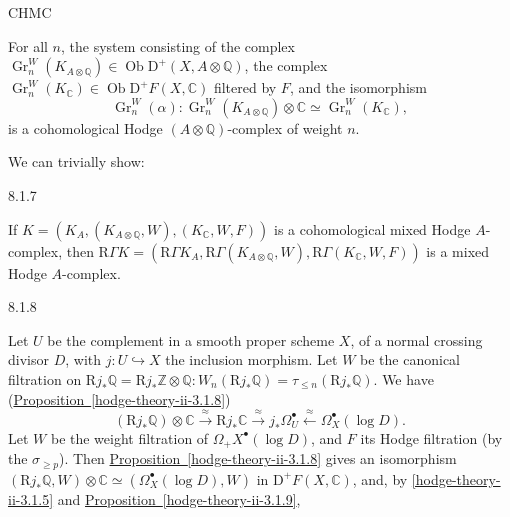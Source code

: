     \begin{axiom}{CHMC}\label{hodge-theory-iii-8.1.6-chmc}\skipsinglepar\par{}For all \(n\), the system consisting of the complex \(\operatorname {Gr}_n^W(K_{A\otimes \mathbb {Q}})\in \operatorname {Ob}\mathrm {D}^+(X,A\otimes \mathbb {Q})\), the complex \(\operatorname {Gr}_n^W(K_\mathbb {C})\in \operatorname {Ob}\mathrm {D}^+F(X,\mathbb {C})\) filtered by \(F\), and the isomorphism
        \[           \operatorname {Gr}_n^W(\alpha )\colon            \operatorname {Gr}_n^W(K_{A\otimes \mathbb {Q}})\otimes \mathbb {C}           \simeq  \operatorname {Gr}_n^W(K_\mathbb {C}),         \]
        is a cohomological Hodge \((A\otimes \mathbb {Q})\)-complex of weight \(n\).\end{axiom}\par{}We can trivially show:\begin{proposition}{8.1.7}\label{hodge-theory-iii-8.1.7}\skipsinglepar\par{}If \(K=(K_A,(K_{A\otimes \mathbb {Q}},W),(K_\mathbb {C},W,F))\) is a cohomological mixed Hodge \(A\)-complex, then \(\mathrm {R}\Gamma  K=(\mathrm {R}\Gamma  K_A,\mathrm {R}\Gamma (K_{A\otimes \mathbb {Q}},W),\mathrm {R}\Gamma (K_\mathbb {C},W,F))\) is a mixed Hodge \(A\)-complex.\end{proposition}\begin{scholium}{8.1.8}\label{hodge-theory-iii-8.1.8}\skipsinglepar\par{}Let \(U\) be the complement in a smooth proper scheme \(X\), of a normal crossing divisor \(D\), with \(j\colon  U\hookrightarrow  X\) the inclusion morphism.
    Let \(W\) be the canonical filtration on \(\mathrm {R} j_*\mathbb {Q}=\mathrm {R} j_*\mathbb {Z}\otimes \mathbb {Q}\colon  W_n(\mathrm {R} j_*\mathbb {Q})=\tau _{\leqslant  n}(\mathrm {R} j_*\mathbb {Q})\).
    We have (\hyperref[hodge-theory-ii-3.1.8]{Proposition~\ref*{hodge-theory-ii-3.1.8}})
    \[       (\mathrm {R} j_*\mathbb {Q})\otimes \mathbb {C}       \xrightarrow {\approx } \mathrm {R} j_*\mathbb {C}       \xrightarrow {\approx } j_*\Omega _U^\bullet        \xleftarrow {\approx } \Omega _X^\bullet (\log  D).     \]
    Let \(W\) be the weight filtration of \(\Omega _+X^\bullet (\log  D)\), and \(F\) its Hodge filtration (by the \(\sigma _{\geqslant  p}\)).
    Then \hyperref[hodge-theory-ii-3.1.8]{Proposition~\ref*{hodge-theory-ii-3.1.8}} gives an isomorphism \((\mathrm {R} j_*\mathbb {Q},W)\otimes \mathbb {C}\simeq (\Omega _X^\bullet (\log  D),W)\) in \(\mathrm {D}^+F(X,\mathbb {C})\), and, by \cref{hodge-theory-ii-3.1.5} and \hyperref[hodge-theory-ii-3.1.9]{Proposition~\ref*{hodge-theory-ii-3.1.9}},

\end{scholium}
